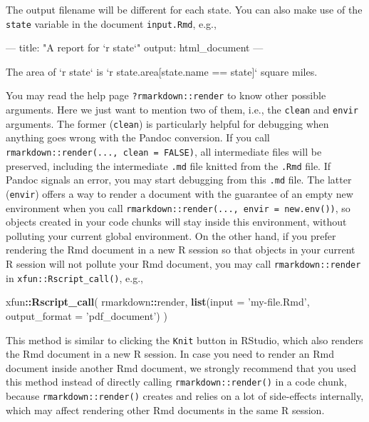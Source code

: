 \documentclass[
  11pt,
]{krantz}
\newenvironment{Shaded}{\begin{snugshade}}{\end{snugshade}}
\newcommand{\BaseNTok}[1]{\textcolor[rgb]{0.06,0.06,0.06}{#1}}
\newcommand{\DataTypeTok}[1]{\textcolor[rgb]{0.27,0.27,0.27}{#1}}
\newcommand{\KeywordTok}[1]{\textcolor[rgb]{0.27,0.27,0.27}{\textbf{#1}}}
\newcommand{\NormalTok}[1]{#1}
\newcommand{\OperatorTok}[1]{\textcolor[rgb]{0.43,0.43,0.43}{\textbf{#1}}}
\newcommand{\StringTok}[1]{\textcolor[rgb]{0.5,0.5,0.5}{#1}}
\begin{document}
The output filename will be different for each state. You can also make use of the \texttt{state} variable in the document \texttt{input.Rmd}, e.g.,

\begin{Shaded}
\begin{Highlighting}[]
\NormalTok{---}
\NormalTok{title: "A report for }\BaseNTok{`r state`}\NormalTok{"}
\NormalTok{output: html_document}
\NormalTok{---}

\NormalTok{The area of }\BaseNTok{`r state`}\NormalTok{ is }\BaseNTok{`r state.area[state.name == state]`}
\NormalTok{square miles.}
\end{Highlighting}
\end{Shaded}

You may read the help page \texttt{?rmarkdown::render} to know other possible arguments. Here we just want to mention two of them, i.e., the \texttt{clean} and \texttt{envir} arguments. The former (\texttt{clean}) is particularly helpful for debugging when anything goes wrong with the Pandoc conversion. If you call \texttt{rmarkdown::render(...,\ clean\ =\ FALSE)}, all intermediate files will be preserved, including the intermediate \texttt{.md} file knitted from the \texttt{.Rmd} file. If Pandoc signals an error, you may start debugging from this \texttt{.md} file. The latter (\texttt{envir}) offers a way to render a document with the guarantee of an empty new environment when you call \texttt{rmarkdown::render(...,\ envir\ =\ new.env())}, so objects created in your code chunks will stay inside this environment, without polluting your current global environment. On the other hand, if you prefer rendering the Rmd document in a new R session so that objects in your current R session will not pollute your Rmd document, you may call \texttt{rmarkdown::render} in \texttt{xfun::Rscript\_call()}, e.g.,

\begin{Shaded}
\begin{Highlighting}[]
\NormalTok{xfun}\OperatorTok{::}\KeywordTok{Rscript_call}\NormalTok{(}
\NormalTok{  rmarkdown}\OperatorTok{::}\NormalTok{render,}
  \KeywordTok{list}\NormalTok{(}\DataTypeTok{input =} \StringTok{'my-file.Rmd'}\NormalTok{, }\DataTypeTok{output_format =} \StringTok{'pdf_document'}\NormalTok{)}
\NormalTok{)}
\end{Highlighting}
\end{Shaded}

This method is similar to clicking the \texttt{Knit} button in RStudio, which also renders the Rmd document in a new R session. In case you need to render an Rmd document inside another Rmd document, we strongly recommend that you used this method instead of directly calling \texttt{rmarkdown::render()} in a code chunk, because \texttt{rmarkdown::render()} creates and relies on a lot of side-effects internally, which may affect rendering other Rmd documents in the same R session.
\end{document}
